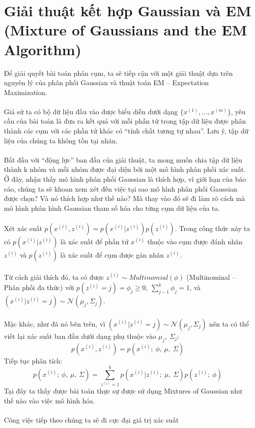 \section{Giải thuật kết hợp Gaussian và EM (Mixture of Gaussians and
the EM Algorithm)}
Để giải quyết bài toán phân cụm, ta sẽ tiếp cận với một giải thuật dựa trên
nguyên lý của phân phối Gaussian và thuật toán EM – Expectation
Maximization.\\\\ 
Giả sử ta có bộ dữ liệu đầu vào được biểu diễn dưới dạng
$\{x^{(1)},\dots,x^{(m)}\}$, yêu cầu của bài toán là đưa ra kết quả với mỗi phần
tử trong tập dữ liệu được phân thành các cụm với các phần tử khác có “tính chất
tương tự nhau”. Lưu ý, tập dữ liệu của chúng ta không tồn tại nhãn.\\\\ 
Bắt đầu với “động lực” ban đầu của giải thuật, ta mong muốn chia tập dữ liệu
thành k nhóm và mỗi nhóm được đại diện bởi một mô hình phân phối xác suất. Ở
đây, nhận thấy mô hình phân phối Gaussian là thích hợp, vì giới hạn của báo cáo,
chúng ta sẽ khoan xem xét đến việc tại sao mô hình phân phối Gaussian được chọn?
Và nó thích hợp như thế nào? Mà thay vào đó sẽ đi làm rõ cách mà mô hình phân
hình Gaussian tham số hóa cho từng cụm dữ liệu của ta.\\\\ 
Xét xác suất $p(x^{(i)},z^{(i)}) = p(x^{(i)}|z^{(i)})p(z^{(i)})$. Trong công
thức này ta có $p(x^{(i)}|z^{(i)})$ là xác suất để phần tử $x^{(i)}$ thuộc vào
cụm được đánh nhãn $z^{(i)}$ và $p(z^{(i)})$ là xác suất để cụm được gán nhãn
$z^{(i)}$.\\\\ 
Từ cách giải thích đó, ta có được  $z^{(i)} \sim Multinomial(\phi
)$ (Multinominal – Phân phối đa thức) với $p(z^{(i)}=j)=\phi_j \geq 0,\:
\sum_{j-1}^{k}\phi_j =1$, và $(x^{(i)}|z^{(i)} =j)\sim
\mathcal{N}(\mu_j,\Sigma_j)$.\\\\ 
Mặc khác, như đã nó bên trên, vì $(x^{(i)}|z^{(i)} =j)\sim
\mathcal{N}(\mu_j,\Sigma_j)$ nên ta có thể viết lại xác suất ban đầu dưới dạng
phụ thuộc vào $\mu_j,\:\Sigma_j$:
\[ p(x^{(i)},z^{(i)}) = p(x^{(i)};\:\phi,\:\mu,\:\Sigma) \]
Tiếp tục phân tích:
\[ p(x^{(i)};\:\phi,\:\mu,\:\Sigma) = \sum_{z^{(i)}=1}^{k}
p(x^{(i)}|z^{(i)};\:\mu,\:\Sigma)p(z^{(i)};\:\phi) \] 
Tại đây ta thấy được bài toán thực sự được sử dụng Mixtures of Gaussian như thế
nào vào việc mô hình hóa.\\\\
Công việc tiếp theo chúng ta sẽ đi cực đại giá trị xác suất
